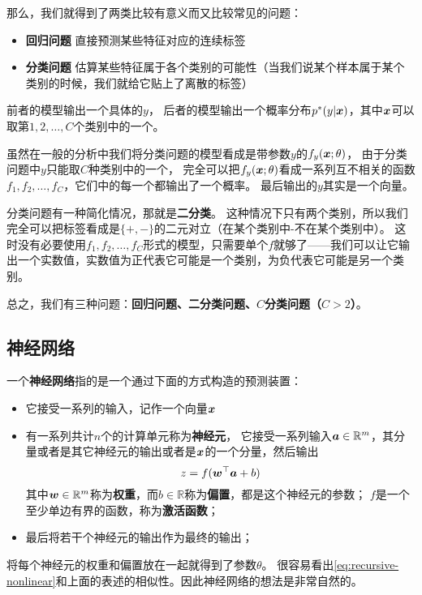 \documentclass[UTF8, a4paper]{ctexart}
\newcommand*{\reals}{\mathbb{R}}
\begin{document}
那么，我们就得到了两类比较有意义而又比较常见的问题： 
\begin{itemize}
    \item \textbf{回归问题} 直接预测某些特征对应的连续标签 
    \item \textbf{分类问题} 估算某些特征属于各个类别的可能性（当我们说某个样本属于某个类别的时候，我们就给它贴上了离散的标签）
\end{itemize}

前者的模型输出一个具体的$y$，
后者的模型输出一个概率分布$p^*(y|\vb*{x})$，其中$\vb*{x}$可以取第$1, 2, \ldots, C$个类别中的一个。

虽然在一般的分析中我们将分类问题的模型看成是带参数$y$的$f_y(\vb*{x};\theta)$，
由于分类问题中$y$只能取$C$种类别中的一个，
完全可以把$f_y(\vb*{x};\theta)$看成一系列互不相关的函数$f_1, f_2, \ldots, f_C$，它们中的每一个都输出了一个概率。
最后输出的$y$其实是一个向量。

分类问题有一种简化情况，那就是\textbf{二分类}。
这种情况下只有两个类别，所以我们完全可以把标签看成是$\{+, -\}$的二元对立（在某个类别中-不在某个类别中）。
这时没有必要使用$f_1, f_2, \ldots, f_C$形式的模型，只需要单个$f$就够了——我们可以让它输出一个实数值，实数值为正代表它可能是一个类别，为负代表它可能是另一个类别。

总之，我们有三种问题：\textbf{回归问题、二分类问题、$C$分类问题（$C>2$）}。

\subsection{神经网络}

一个\textbf{神经网络}指的是一个通过下面的方式构造的预测装置：
\begin{itemize}
    \item 它接受一系列的输入，记作一个向量$\vb*{x}$
    \item 有一系列共计$n$个的计算单元称为\textbf{神经元}，
    它接受一系列输入$\vb*{a} \in \reals^m$，其分量或者是其它神经元的输出或者是$\vb*{x}$的一个分量，然后输出
    \begin{equation}
        z = f(\vb*{w}^\top \vb*{a} + b)
        \label{eq:neuron}
    \end{equation}
    其中$\vb*{w}\in \reals^m$称为\textbf{权重}，而$b \in \reals$称为\textbf{偏置}，都是这个神经元的参数；
    $f$是一个至少单边有界的函数，称为\textbf{激活函数}；
    \item 最后将若干个神经元的输出作为最终的输出；
\end{itemize}

将每个神经元的权重和偏置放在一起就得到了参数$\theta$。
很容易看出\eqref{eq:recursive-nonlinear}和上面的表述的相似性。因此神经网络的想法是非常自然的。
\end{document}
